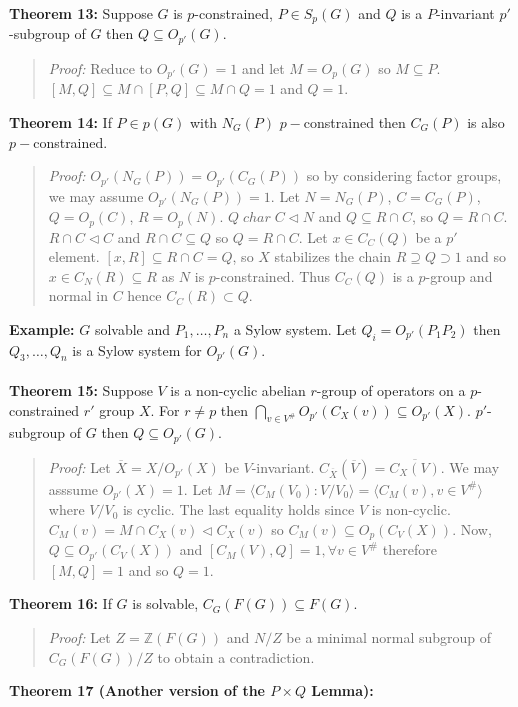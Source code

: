 {\bf Theorem 13:}  Suppose $G$ is $p$-constrained, $P \in S_p(G)$ and $Q$ is a $P$-invariant
$p'$-subgroup of $G$ then $Q \subseteq O_{p'}(G)$.
\begin{quote}
\emph{Proof:}  
Reduce to $O_{p'}(G) = 1$ and let $M= O_p(G)$ so $M \subseteq P$.
$[M, Q] \subseteq M \cap [P, Q] \subseteq M \cap Q = 1$ and $Q = 1$.
\end{quote}
{\bf Theorem 14:}
If $P \in p(G)$ with $N_G(P)$ $p-$constrained then $C_G(P)$ is also $p-$constrained.
\begin{quote}
\emph{Proof:}  
$O_{p'}(N_G(P)) = O_{p'}(C_G(P))$ so by considering factor groups, we may assume
$O_{p'}(N_G(P))= 1$.  Let $N= N_G(P)$, $C= C_G(P)$, $Q= O_p(C)$, $R= O_p(N)$.
$Q \; char \; C \lhd N$ and $Q \subseteq R \cap C$, so $Q= R \cap C$.
$R \cap C \lhd C$ and $ R \cap C \subseteq Q$ so $Q = R \cap C$.
Let $x \in C_C(Q)$ be a $p'$ element.   $[x, R] \subseteq R \cap C = Q$,
so $X$ stabilizes the chain $R \supseteq Q \supset 1$ and so $x \in C_N(R) \subseteq R$ as
$N$ is $p$-constrained.  Thus $C_C(Q)$ is a $p$-group and normal in $C$ hence $C_C(R) \subset Q$.
\end{quote}
{\bf Example:} $G$ solvable and $P_1, \ldots, P_n$ a Sylow system.  Let $Q_i= O_{p'}(P_1P_2)$
then $Q_3, \ldots, Q_n$ is a Sylow system for $O_{p'}(G)$.
\\
\\
{\bf Theorem 15:}  Suppose $V$ is a non-cyclic abelian $r$-group of operators on a $p$-constrained
$r'$ group $X$.  For $r \ne p$ then $\bigcap_{v \in V^{\#}} O_{p'}(C_X(v)) \subseteq O_{p'}(X)$.
$p'$-subgroup of $G$ then $Q \subseteq O_{p'}(G)$.
\begin{quote}
\emph{Proof:}  
Let ${\overline X}= X/O_{p'}(X)$ be $V$-invariant.  
$C_{\overline X}({\overline V}) = {\overline {C_{X}( V)}}$.  We may asssume
$O_{p'}(X) = 1$.  Let 
$M = \langle C_M (V_0 ): V/V_0 \rangle = \langle C_M(v), v \in V^{\#} \rangle $
where $V/V_0$ is cyclic.
The last equality holds since $V$ is non-cyclic.
$C_M(v) = M \cap C_X(v) \lhd C_X(v)$ so $C_M(v) \subseteq O_p(C_V(X))$.
Now, $Q \subseteq O_{p'}(C_V(X))$ and $[C_M(V), Q] =1, \forall v \in V^{\#}$ therefore
$[M, Q] = 1$ and so $Q = 1$.
\end{quote}
{\bf Theorem 16:}
If $G$ is solvable, $C_G(F(G)) \subseteq F(G)$.
\begin{quote}
\emph{Proof:}
Let $Z = {\mathbb Z}(F(G))$ and 
$N/Z$ be a minimal normal subgroup of $C_G(F(G))/Z$ to obtain a contradiction.
\end{quote}
{\bf Theorem 17 (Another version of the $P \times Q$ Lemma):}
